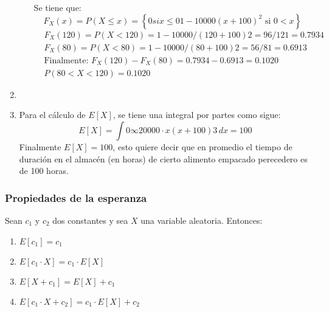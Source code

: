 \begin{enumerate}
\begin{enumerate}
                    Se tiene que:
                    \begin{equation*}
                        F_X(x)=P(X\leq x)=\left\{ 0 si x\leq 01-10000\left(x+100 \right)^2\text{ si } 0< x\right\}
                    \end{equation*}
                    \begin{align*}
                         & F_X (120)=P(X<120)=1-10000/(120+100)2=96/121=0.7934      \\
                         & F_X (80)=P(X<80)=1-10000/(80+100)2=56/81=0.6913          \\
                         & \text{Finalmente: }F_X(120)-F_X(80)=0.7934-0.6913=0.1020 \\
                         & P(80<X<120)=0.1020
                    \end{align*}
          \end{enumerate}
    \item %

    \item Para el cálculo de $E\left[ X\right]$, se tiene una integral por partes como sigue:
          \begin{equation*}
              E\left[  X\right]=\int 0\infty 20000\cdot x(x+100)3\,dx=100
          \end{equation*}
          Finalmente $E\left[ X\right]=100$, esto quiere decir que en
          promedio el tiempo de duración en el almacén (en
          horas) de cierto alimento empacado perecedero es de
          100 horas.

\end{enumerate}

\subsubsection{Propiedades de la esperanza}

Sean $c_1$ y $c_2$ dos constantes y sea $X$ una variable
aleatoria. Entonces:

\begin{enumerate}
    \item $E\left[ c_1\right]=c_1$
    \item $E\left[ c_1\cdot X\right]=c_1\cdot E\left[ X\right]$
    \item $E\left[ X+c_1\right]=E\left[ X\right]+c_1$
    \item $E\left[ c_1\cdot X+c_2\right]=c_1\cdot E\left[ X\right]+c_2$
\end{enumerate}

